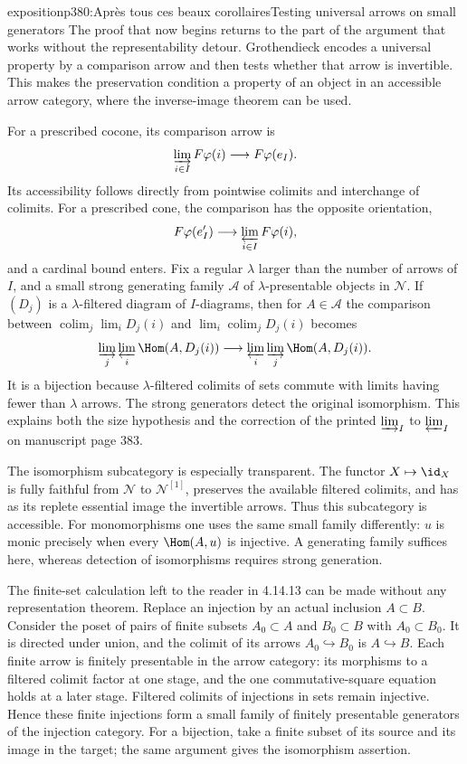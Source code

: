 \begin{dcomment}{exposition}{p380:Après tous ces beaux corollaires}{Testing universal arrows on small generators}
The proof that now begins returns to the part of the argument that works without the representability detour. Grothendieck encodes a universal property by a comparison arrow and then tests whether that arrow is invertible. This makes the preservation condition a property of an object in an accessible arrow category, where the inverse-image theorem can be used.

For a prescribed cocone, its comparison arrow is
\[
 \varinjlim_{i\in I}F\varphi(i)\longrightarrow F\varphi(e_I).
\]
Its accessibility follows directly from pointwise colimits and interchange of colimits. For a prescribed cone, the comparison has the opposite orientation,
\[
 F\varphi(e'_I)\longrightarrow\varprojlim_{i\in I}F\varphi(i),
\]
and a cardinal bound enters. Fix a regular $\lambda$ larger than the number of arrows of $I$, and a small strong generating family $\mathcal A$ of $\lambda$-presentable objects in $\mathcal N$. If $(D_j)$ is a $\lambda$-filtered diagram of $I$-diagrams, then for $A\in\mathcal A$ the comparison between $\operatorname{colim}_j\lim_iD_j(i)$ and $\lim_i\operatorname{colim}_jD_j(i)$ becomes
\[
 \varinjlim_j\varprojlim_i\Hom(A,D_j(i))
 \longrightarrow
 \varprojlim_i\varinjlim_j\Hom(A,D_j(i)).
\]
It is a bijection because $\lambda$-filtered colimits of sets commute with limits having fewer than $\lambda$ arrows. The strong generators detect the original isomorphism. This explains both the size hypothesis and the correction of the printed $\varinjlim_I$ to $\varprojlim_I$ on manuscript page 383.

The isomorphism subcategory is especially transparent. The functor $X\mapsto\id_X$ is fully faithful from $\mathcal N$ to $\mathcal N^{[1]}$, preserves the available filtered colimits, and has as its replete essential image the invertible arrows. Thus this subcategory is accessible. For monomorphisms one uses the same small family differently: $u$ is monic precisely when every $\Hom(A,u)$ is injective. A generating family suffices here, whereas detection of isomorphisms requires strong generation.

The finite-set calculation left to the reader in 4.14.13 can be made without any representation theorem. Replace an injection by an actual inclusion $A\subset B$. Consider the poset of pairs of finite subsets $A_0\subset A$ and $B_0\subset B$ with $A_0\subset B_0$. It is directed under union, and the colimit of its arrows $A_0\hookrightarrow B_0$ is $A\hookrightarrow B$. Each finite arrow is finitely presentable in the arrow category: its morphisms to a filtered colimit factor at one stage, and the one commutative-square equation holds at a later stage. Filtered colimits of injections in sets remain injective. Hence these finite injections form a small family of finitely presentable generators of the injection category. For a bijection, take a finite subset of its source and its image in the target; the same argument gives the isomorphism assertion.


\end{dcomment}

